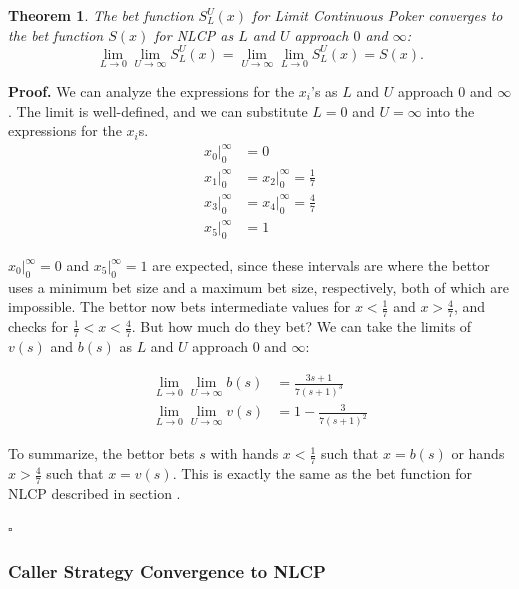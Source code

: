 \documentclass[a4paper,12pt]{article}
\theoremstyle{plain}
\newtheorem{theorem}{Theorem}[section]
\theoremstyle{definition}
\newenvironment{customproof}[1][Proof]{\noindent\textbf{#1.} }{\hfill$\square$\vspace{1em}}
\begin{document}
\begin{theorem}
    The bet function $S_L^U(x)$ for Limit Continuous Poker converges to the bet function $S(x)$ for NLCP as $L$ and $U$ approach $0$ and $\infty$:
\[
\lim_{L \to 0} \lim_{U \to \infty} S_L^U(x) = \lim_{U \to \infty} \lim_{L \to 0} S_L^U(x) = S(x).
\]
\end{theorem}
\begin{customproof}
We can analyze the expressions for the $x_i$'s as $L$ and $U$ approach $0$ and $\infty$. The limit is well-defined, and we can substitute $L=0$ and $U=\infty$ into the expressions for the $x_i$s.
\begin{align*}
    x_0|_0^\infty &= 0 \\
    x_1|_0^\infty &= x_2|_0^\infty = \frac{1}{7} \\
    x_3|_0^\infty &= x_4|_0^\infty = \frac{4}{7} \\
    x_5|_0^\infty &= 1
\end{align*}

$x_0|_0^\infty = 0$ and $x_5|_0^\infty = 1$ are expected, since these intervals are where the bettor uses a minimum bet size and a maximum bet size, respectively, both of which are impossible. The bettor now bets intermediate values for $x < \frac{1}{7}$ and $x > \frac{4}{7}$, and checks for $\frac{1}{7} < x < \frac{4}{7}$. But how much do they bet? We can take the limits of $v(s)$ and $b(s)$ as $L$ and $U$ approach $0$ and $\infty$:

\begin{align*}
    \lim_{L \to 0} \lim_{U \to \infty} b(s) &= \frac{3 s+1}{7 (s+1)^3}\\
    \lim_{L \to 0} \lim_{U \to \infty} v(s) &= 1 - \frac{3}{7 (s+1)^2}
\end{align*}

To summarize, the bettor bets $s$ with hands $x < \frac{1}{7}$ such that $x = b(s)$ or hands $x > \frac{4}{7}$ such that $x = v(s)$. This is exactly the same as the bet function for NLCP described in section .

\end{customproof}

\subsubsection{Caller Strategy Convergence to NLCP}
\end{document}

